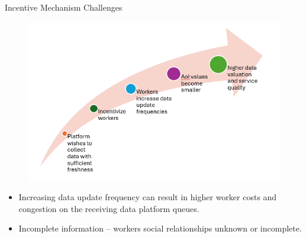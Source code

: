 \documentclass[aspectratio=169,xcolor=dvipsnames]{beamer}
\begin{document}

\begin{frame}[fragile]{Incentive Mechanism Challenges}
    \footnotesize %
    \begin{figure}
        \includegraphics[width=0.5\linewidth]{incentive_flow.png} \pause
    \end{figure}

    \begin{itemize}
        \setlength{\itemsep} %
        \item Increasing data update frequency can result in higher worker costs and congestion on the receiving data platform queues.\\ \pause
        
        \item Incomplete information – workers social relationships unknown or incomplete.\\
        
    \end{itemize}

\end{frame}

\end{document}
